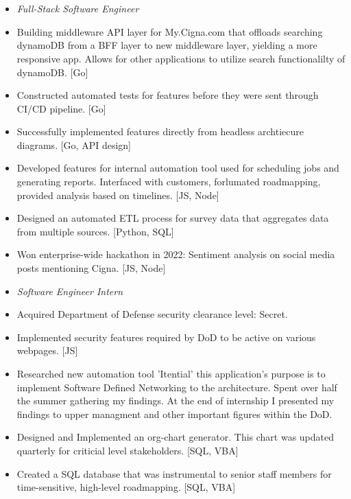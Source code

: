 \documentclass{article}
\begin{document}
\section{\\}
\color{black}
\begin{itemize}
\subsection{\large Cigna\hfill\mdseries July 2021 - Present}
 \item[] \textit{Full-Stack Software Engineer } %
\item Building middleware API layer for My.Cigna.com that offloads searching dynamoDB from a BFF layer to new middleware layer, yielding a more responsive app. Allows for other applications to utilize search functionalilty of dynamoDB. [Go]
\item Constructed automated tests for features before they were sent through CI/CD pipeline. [Go]
\item Successfully implemented features directly from headless archtiecure diagrams. [Go, API design]
\item Developed features for internal automation tool used for scheduling jobs and generating reports. Interfaced with customers, forlumated roadmapping,  provided analysis based on timelines. [JS, Node]
\item Designed an automated ETL process for survey data that aggregates data from multiple sources. [Python, SQL]
\item Won enterprise-wide hackathon in 2022: Sentiment analysis on social media posts mentioning Cigna. [JS, Node]
\end{itemize}
\begin{itemize}
\subsection{\\\large Leidos\hfill\mdseries Summer 2019/2020}
\item[] \textit{Software Engineer Intern } %
\item Acquired Department of Defense security clearance level: Secret.
\item Implemented security features required by DoD to be active on various webpages. [JS]
\item Researched new automation tool 'Itential' this application's purpose is to implement Software Defined Networking to the architecture. Spent over half the summer gathering my findings. At the end of internship I presented my findings to upper managment and other important figures within the DoD.
\item Designed and Implemented an org-chart generator. This chart was updated quarterly for criticial level stakeholders. [SQL, VBA]
\item Created a SQL database that was instrumental to senior staff members for time-sensitive, high-level roadmapping. [SQL, VBA]
\end{itemize}
\color{blue}
\end{document}
